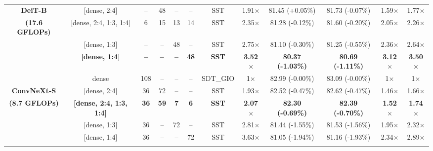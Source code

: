 \begin{table*}[t]
{\begin{tabular}{c|c|c|c|c|c|c|c|c|c||c|c}
\textbf{DeiT-B} & [dense, 2:4] & -- & 48 & -- & -- & SST & 1.91$\times$ & 81.45 (+0.05\%) & 81.73 (-0.07\%) & 1.59$\times$ & 1.77$\times$ \\

\textbf{(17.6 GFLOPs)} & [dense, 2:4, 1:3, 1:4] & 6 & 15 & 13 & 14 & SST & 2.35$\times$ & 81.28 (-0.12\%) & 81.60 (-0.20\%) & 2.05$\times$ & 2.26$\times$ \\

& [dense, 1:3] & -- & -- & 48 & -- & SST & 2.75$\times$ & 81.10 (-0.30\%) & 81.25 (-0.55\%) & 2.36$\times$ & 2.64$\times$ \\

& \textbf{[dense, 1:4]} & \textbf{--} & \textbf{--} & \textbf{--} & \textbf{48} & \textbf{SST} & \textbf{3.52$\times$} & \textbf{80.37 (-1.03\%)} & \textbf{80.69 (-1.11\%)} & \textbf{3.12$\times$} & \textbf{3.50$\times$} \\

\hline

& dense & 108 & -- & -- & -- & SDT\_GIO & 1$\times$ & 82.99 (-0.00\%) & 83.09 (-0.00\%) & 1$\times$ & 1$\times$\\

\textbf{ConvNeXt-S}& [dense, 2:4] & 36 & 72 & -- & -- & SST & 1.93$\times$ & 82.52 (-0.47\%) & 82.62 (-0.47\%) & 1.46$\times$ & 1.66$\times$ \\

\textbf{(8.7 GFLOPs)}& \textbf{[dense, 2:4, 1:3, 1:4]} & \textbf{36} & \textbf{59} & \textbf{7} & \textbf{6} & \textbf{SST} & \textbf{2.07$\times$} & \textbf{82.30 (-0.69\%)} & \textbf{82.39 (-0.70\%)} & \textbf{1.52$\times$} & \textbf{1.74$\times$} \\

& [dense, 1:3] & 36 & -- & 72 & -- & SST &  2.81$\times$ & 81.44 (-1.55\%) & 81.53 (-1.56\%) & 1.95$\times$ & 2.32$\times$ \\

& [dense, 1:4] & 36 & -- & -- & 72 & SST & 3.63$\times$ & 81.05 (-1.94\%) & 81.16 (-1.93\%) & 2.34$\times$ & 2.89$\times$ \\




\Xhline{2.5\arrayrulewidth}

\end{tabular}
}
\label{tb:DNN_sparsity_results}

\vspace{-0.40cm}

\end{table*}


